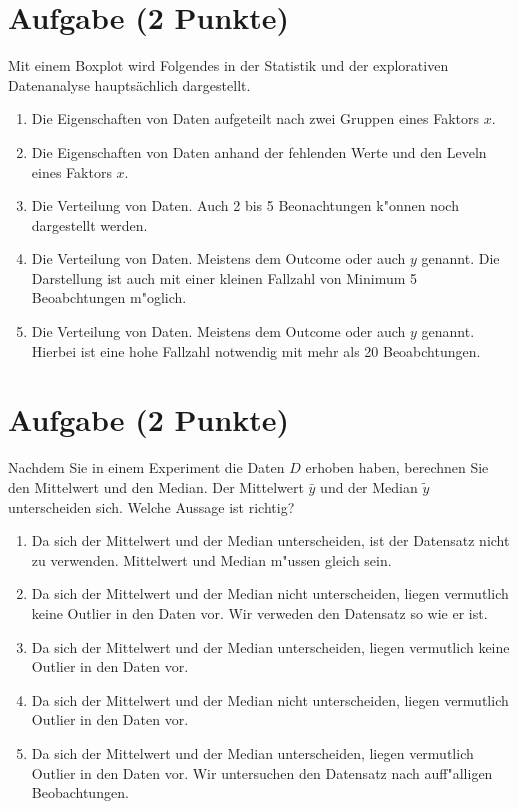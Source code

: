 \documentclass[a4paper, 10pt]{scrartcl}\usepackage[]{graphicx}\usepackage[]{xcolor}
\begin{document}
\section{Aufgabe \hfill (2 Punkte)}



Mit einem Boxplot wird Folgendes in der Statistik und der explorativen Datenanalyse haupts{\"a}chlich dargestellt.



\begin{enumerate}
\item [\textbf{A} \msquare] Die Eigenschaften von Daten aufgeteilt nach zwei Gruppen eines Faktors $x$.
\item [\textbf{B} \msquare] Die Eigenschaften von Daten anhand der fehlenden Werte und den Leveln eines Faktors $x$.
\item [\textbf{C} \msquare] Die Verteilung von Daten. Auch 2 bis 5 Beonachtungen k{"o}nnen noch dargestellt werden.
\item [\textbf{D} \msquare] Die Verteilung von Daten. Meistens dem Outcome oder auch $y$ genannt. Die Darstellung ist auch mit einer kleinen Fallzahl von Minimum 5 Beoabchtungen m{"o}glich.
\item [\textbf{E} \msquare] Die Verteilung von Daten. Meistens dem Outcome oder auch $y$ genannt. Hierbei ist eine hohe Fallzahl notwendig mit mehr als 20 Beoabchtungen.
\end{enumerate} 

\section{Aufgabe \hfill (2 Punkte)}



Nachdem Sie in einem Experiment die Daten $D$ erhoben haben, berechnen Sie den
Mittelwert und den Median. Der Mittelwert $\bar{y}$ und der Median
$\tilde{y}$ unterscheiden sich. Welche Aussage ist richtig?




\begin{enumerate}
\item [\textbf{A} \msquare] Da sich der Mittelwert und der Median unterscheiden, ist der Datensatz nicht zu verwenden. Mittelwert und Median m{"u}ssen gleich sein.
\item [\textbf{B} \msquare] Da sich der Mittelwert und der Median nicht unterscheiden, liegen vermutlich keine Outlier in den Daten vor. Wir verweden den Datensatz so wie er ist.
\item [\textbf{C} \msquare] Da sich der Mittelwert und der Median unterscheiden, liegen vermutlich keine Outlier in den Daten vor.
\item [\textbf{D} \msquare] Da sich der Mittelwert und der Median nicht unterscheiden, liegen vermutlich Outlier in den Daten vor.
\item [\textbf{E} \msquare] Da sich der Mittelwert und der Median unterscheiden, liegen vermutlich Outlier in den Daten vor. Wir untersuchen den Datensatz nach auff{"a}lligen Beobachtungen.
\end{enumerate}
\end{document}
